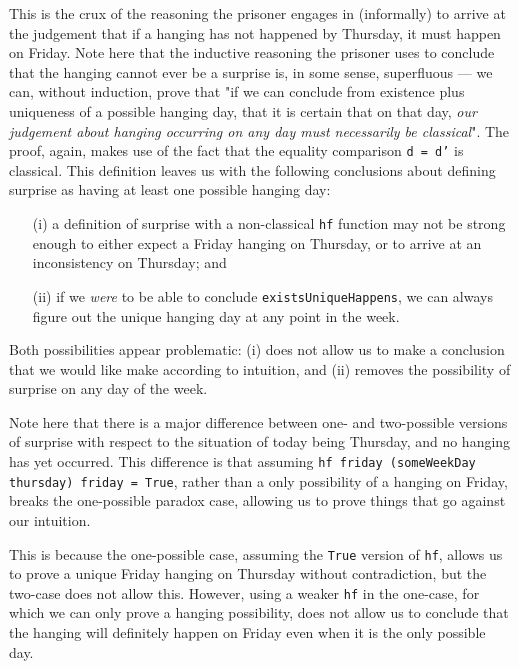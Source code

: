 \documentclass[runningheads]{llncs}
\begin{document}
This is the crux of the reasoning the prisoner
engages in (informally) to arrive at the judgement that
if a hanging has not happened by Thursday, it must happen on Friday.
Note here that the inductive reasoning the prisoner uses to conclude that the
hanging cannot ever be a surprise is, in some sense, superfluous --- we can,
without induction, prove that "if we can conclude
from existence plus uniqueness of a possible hanging day, that it is certain that on that day,
\emph{our judgement about hanging occurring on any day must necessarily be classical}".
The proof, again, makes use of the fact that the equality comparison {\tt d = d'} is
classical. This definition leaves us with the following conclusions about defining surprise as
having at least one possible hanging day:

\begin{itemize}
  \item[(i)] a definition of surprise with a non-classical {\tt hf} function
  may not be strong enough to either expect
  a Friday hanging on Thursday, or to arrive at an inconsistency
  on Thursday; and \newline

  \item[(ii)] if we \emph{were} to be able to conclude {\tt existsUniqueHappens},
  we can always figure out the unique hanging day at any point in the week.
\end{itemize}

Both possibilities appear problematic: (i) does not allow us to make
a conclusion that we would like make according to intuition,
and (ii) removes the possibility of surprise on any day of the week.

Note here that there is a major difference
between one- and two-possible versions of surprise with respect
to the situation of today being Thursday, and no hanging has yet occurred.
This difference is that assuming
{\tt hf friday (someWeekDay thursday) friday = True}, rather than a only
possibility of a hanging on Friday, breaks the one-possible paradox case,
allowing us to prove things that go against our intuition.

This is because the one-possible case, assuming the {\tt True} version of {\tt hf},
allows us to prove a unique Friday hanging on Thursday without contradiction, but
the two-case does not allow this. However, using a weaker {\tt hf} in the one-case, for which
we can only prove a hanging possibility, does not allow us to conclude that
the hanging will definitely happen on Friday even when it is the only possible day.
\end{document}
